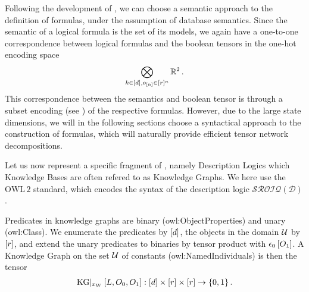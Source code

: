 
Following the development of , we can choose a semantic approach to the definition of formulas, under the assumption of database semantics.
Since the semantic of a logical formula is the set of its models, we again have a one-to-one correspondence between logical formulas and the boolean tensors in the one-hot encoding space
\begin{align*}
    \bigotimes_{k\in[d],o_{[n]}\in[r]^{n}} \mathbb{R}^2 \, .
\end{align*}
This correspondence between the semantics and boolean tensor is through a subset encoding (see ) of the respective formulas.
However, due to the large state dimensions, we will in the following sections choose a syntactical approach to the construction of formulas, which will naturally provide efficient tensor network decompositions.






\label{sec:kgRepresentation}

Let us now represent a specific fragment of \firstOrderLogic{}, namely Description Logics which Knowledge Bases are often refered to as Knowledge Graphs.
We here use the $\mathrm{OWL\,2}$ standard, which encodes the syntax of the description logic $\mathcal{SROIQ(D)}$ \cite{rudolph_foundations_2011}.


Predicates in knowledge graphs are binary (owl:ObjectProperties) and unary (owl:Class).
We enumerate the predicates by $[d]$, the objects in the domain $\mathcal{U}$ by $[r]$, and extend the unary predicates to binaries by tensor product with $\epsilon_{0}\left[O_{1}\right]$.
A Knowledge Graph on the set $\mathcal{U}$ of constants (owl:NamedIndividuals) is then the tensor
\begin{align*}
    \mathrm{KG}|_{x_{W}}\left[L,O_{0},O_{1}\right] : [d] \times [r] \times [r] \rightarrow \{0,1\} \, .
\end{align*}


\label{subsec:knowledgeGraphTernaryRep}

